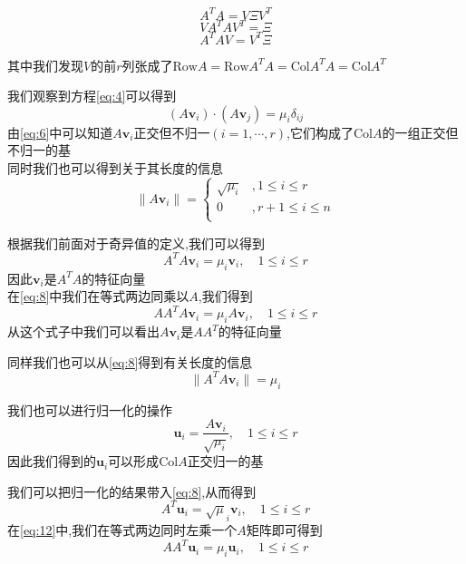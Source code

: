 \documentclass{article}
\newcommand{\ve}{\boldsymbol}
\newcommand{\col}{\text{Col}}
\newcommand{\row}{\text{Row}}
\begin{document}
\begin{CJK}{UTF8}{gkai}
\begin{equation}
    A^T A = V \varXi V^T
\end{equation}
\begin{equation}
    VA^T A V^T = \varXi
\label{eq:4}
\end{equation}
\begin{equation}
    A^T A V = V^T \varXi
\end{equation}

其中我们发现$V$的前$r$列张成了$\row A = \row A^TA = \col A^T A = \col A^T$

我们观察到方程\ref{eq:4}可以得到
\begin{equation}
    (A\ve{v}_i) \cdot (A\ve{v}_j) = \mu_{i} \delta_{ij}
\label{eq:6}
\end{equation}
由\ref{eq:6}中可以知道$A\ve{v}_i$正交但不归一$(i = 1,\cdots,r)$,它们构成了$\col A$的一组正交但不归一的基\\
同时我们也可以得到关于其长度的信息
\begin{equation}
\|A\ve{v}_i\| = 
\begin{cases}
    \sqrt{\mu_i} &, 1\leq i\leq r\\
    0 &,r+1 \leq i \leq n\\ 
\end{cases}
\end{equation}

根据我们前面对于奇异值的定义,我们可以得到
\begin{equation}
    A^T A \ve{v}_i = \mu_i \ve{v}_i , \quad 1\leq i \leq r
\label{eq:8}
\end{equation}
因此$\ve{v}_i$是$A^TA$的特征向量\\
在\ref{eq:8}中我们在等式两边同乘以$A$,我们得到
\begin{equation}
    A A^T A \ve{v}_i = \mu_i A \ve{v}_i,\quad 1\leq i \leq r
\end{equation}
从这个式子中我们可以看出$A\ve{v}_i$是$A A^T$的特征向量

同样我们也可以从\ref{eq:8}得到有关长度的信息
\begin{equation}
    \|A^T A\ve{v}_i\| = \mu_i 
\end{equation}

我们也可以进行归一化的操作
\begin{equation}
    \ve{u}_i = \dfrac{A\ve{v}_i}{\sqrt{\mu_i}},\quad 1\leq i \leq r
\end{equation}
因此我们得到的$\ve{u}_i$可以形成$\col A$正交归一的基

我们可以把归一化的结果带入\ref{eq:8},从而得到
\begin{equation}
    A^T \ve{u}_i= \sqrt{\mu}_i \ve{v}_i,\quad 1\leq i \leq r
\label{eq:12}
\end{equation}
在\ref{eq:12}中,我们在等式两边同时左乘一个$A$矩阵即可得到
\begin{equation}
    A A^T \ve{u}_i= \mu_i \ve{u}_i,\quad 1\leq i \leq r    
\end{equation}


\end{CJK}
\end{document}
